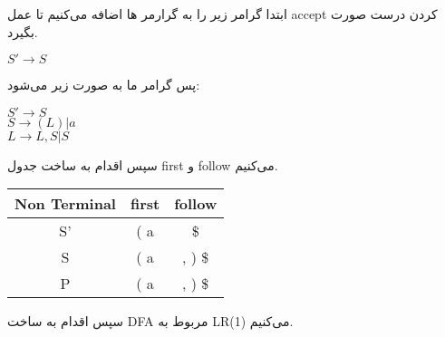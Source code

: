 

ابتدا گرامر زیر را به گرارمر ها اضافه می‌کنیم تا عمل accept کردن درست صورت بگیرد.

\begin{center}
\begin{latin}
$S' \rightarrow S$
\end{latin}
\end{center}

پس گرامر ما به صورت زیر می‌شود:

\begin{center}
\begin{latin}
$S' \rightarrow S$
\\
$S \rightarrow (L) | a$
\\
$L \rightarrow L,S | S$
\end{latin}
\end{center}

سپس اقدام به ساخت جدول first و follow می‌کنیم.

\begin{center}
    \begin{latin}
        \begin{tabular}{|c|c|c|}
            \hline
            Non Terminal & first & follow \\ \hline
            S'           & ( a   & \$     \\ \hline
            S            & ( a   & , ) \$  \\ \hline
            P            & ( a   & , ) \$  \\ \hline
        \end{tabular}
    \end{latin}
\end{center}

سپس اقدام به ساخت DFA مربوط به LR(1) می‌کنیم.


